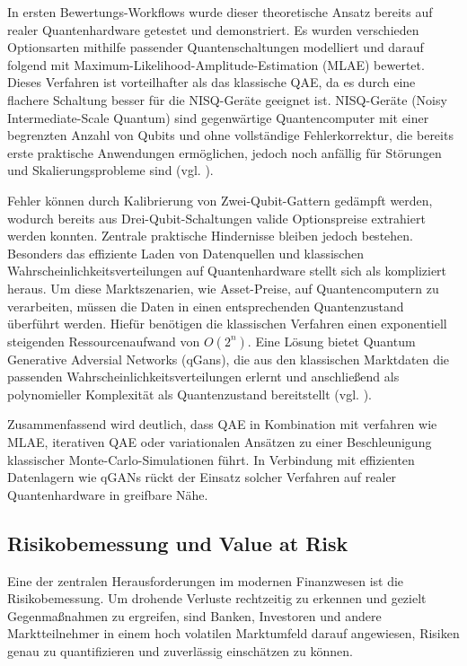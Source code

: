 In ersten Bewertungs-Workflows wurde dieser theoretische Ansatz bereits auf realer Quantenhardware getestet und demonstriert. Es wurden verschieden Optionsarten mithilfe passender Quantenschaltungen modelliert und darauf folgend mit Maximum-Likelihood-Amplitude-Estimation (MLAE) bewertet. Dieses Verfahren ist vorteilhafter als das klassische QAE, da es durch eine flachere Schaltung besser für die NISQ-Geräte geeignet ist. NISQ-Geräte (Noisy Intermediate-Scale Quantum) sind gegenwärtige Quantencomputer mit einer begrenzten Anzahl von Qubits und ohne vollständige Fehlerkorrektur, die bereits erste praktische Anwendungen ermöglichen, jedoch noch anfällig für Störungen und Skalierungsprobleme sind (vgl. \cite{stamatopoulos_option_2020}).

Fehler können durch Kalibrierung von Zwei-Qubit-Gattern gedämpft werden, wodurch bereits aus Drei-Qubit-Schaltungen valide Optionspreise extrahiert werden konnten. Zentrale praktische Hindernisse bleiben jedoch bestehen. Besonders das effiziente Laden von Datenquellen und klassischen Wahrscheinlichkeitsverteilungen auf Quantenhardware stellt sich als kompliziert heraus. Um diese Marktszenarien, wie Asset-Preise, auf Quantencomputern zu verarbeiten, müssen die Daten in einen entsprechenden Quantenzustand überführt werden. Hiefür benötigen die klassischen Verfahren einen exponentiell steigenden Ressourcenaufwand von $O(2^n)$. Eine Lösung bietet Quantum Generative Adversial Networks (qGans), die aus den klassischen Marktdaten die passenden Wahrscheinlichkeitsverteilungen erlernt und anschließend als polynomieller Komplexität als Quantenzustand bereitstellt (vgl. \cite{zoufal_quantum_2019}).

Zusammenfassend wird deutlich, dass QAE in Kombination mit verfahren wie MLAE, iterativen QAE oder variationalen Ansätzen zu einer Beschleunigung klassischer Monte-Carlo-Simulationen führt. In Verbindung mit effizienten Datenlagern wie qGANs rückt der Einsatz solcher Verfahren auf realer Quantenhardware in greifbare Nähe.

\subsection{Risikobemessung und Value at Risk}

Eine der zentralen Herausforderungen im modernen Finanzwesen ist die Risikobemessung. Um drohende Verluste rechtzeitig zu erkennen und gezielt Gegenmaßnahmen zu ergreifen, sind Banken, Investoren und andere Marktteilnehmer in einem hoch volatilen Marktumfeld darauf angewiesen, Risiken genau zu quantifizieren und zuverlässig einschätzen zu können.

